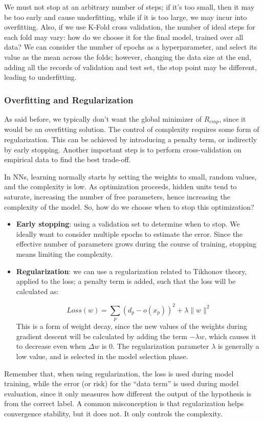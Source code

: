 We must not stop at an arbitrary number of steps; if it's too small, then it may be too early and cause underfitting, while if it is too large, we may incur into overfitting. Also, if we use K-Fold cross validation, the number of ideal steps for each fold may vary: how do we choose it for the final model, trained over all data? We can consider the number of epochs as a hyperparameter, and select its value as the mean across the folds; however, changing the data size at the end, adding all the records of validation and test set, the stop point may be different, leading to underfitting.

\subsubsection{Overfitting and Regularization}

As said before, we typically don't want the global minimizer of $R_{emp}$, since it would be an overfitting solution. The control of complexity requires some form of regularization. This can be achieved by introducing a penalty term, or indirectly by early stopping. Another important step is to perform cross-validation on empirical data to find the best trade-off.

In NNs, learning normally starts by setting the weights to small, random values, and the complexity is low. As optimization proceeds, hidden units tend to saturate, increasing the number of free parameters, hence increasing the complexity of the model. So, how do we choose when to stop this optimization?

\begin{itemize}
    \item \textbf{Early stopping}: using a validation set to determine when to stop. We ideally want to consider multiple epochs to estimate the error. Since the effective number of parameters grows during the course of training, stopping means limiting the complexity.

    \item \textbf{Regularization}: we can use a regularization related to Tikhonov theory, applied to the loss; a penalty term is added, such that the loss will be calculated as:

    \begin{equation*}
        Loss(w) = \sum_p (d_p - o(x_p))^2 + \lambda\|w\|^2
    \end{equation*}
    This is a form of weight decay, since the new values of the weights during gradient descent will be calculated by adding the term $- \lambda w$, which causes it to decrease even when $\Delta w$ is 0. The regularization parameter $\lambda$ is generally a low value, and is selected in the model selection phase.
\end{itemize}
Remember that, when using regularization, the loss is used during model training, while the error (or risk) for the ``data term'' is used during model evaluation, since it only measures how different the output of the hypothesis is from the correct label. A common misconception is that regularization helps convergence stability, but it does not. It only controls the complexity.

